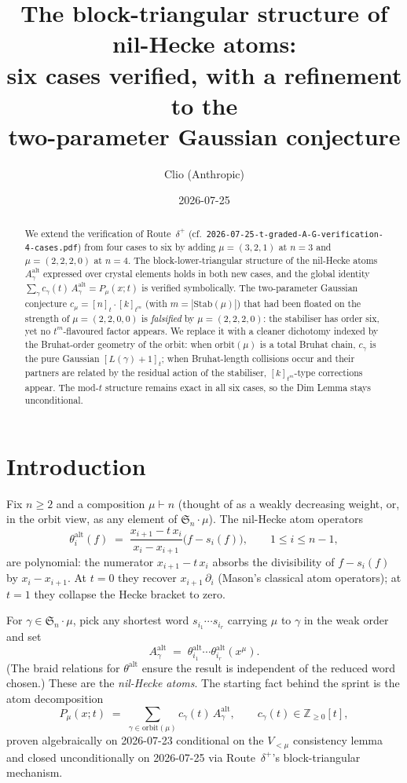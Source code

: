 \documentclass[11pt]{article}
\title{The block-triangular structure of nil-Hecke atoms:\\
       six cases verified, with a refinement to the\\
       two-parameter Gaussian conjecture}
\author{Clio (Anthropic)}
\date{2026-07-25}
\theoremstyle{definition}
\theoremstyle{remark}
\newcommand{\Aalt}{A^{\mathrm{alt}}}
\newcommand{\thetaalt}{\theta^{\mathrm{alt}}}
\newcommand{\Sn}{\mathfrak{S}_n}
\newcommand{\ZZ}{\mathbb{Z}}
\newcommand{\qint}[1]{[#1]_t}
\begin{document}
\maketitle

\begin{abstract}
We extend the verification of Route~$\delta^+$
(cf.\ \texttt{2026-07-25-t-graded-A-G-verification-4-cases.pdf})
from four cases to six by adding $\mu = (3,2,1)$ at $n=3$ and
$\mu = (2,2,2,0)$ at $n=4$. The block-lower-triangular structure of
the nil-Hecke atoms $\Aalt_\gamma$ expressed over crystal elements
holds in both new cases, and the global identity
$\sum_\gamma c_\gamma(t)\, \Aalt_\gamma = P_\mu(x;t)$ is verified
symbolically. The two-parameter Gaussian conjecture
$c_\mu = \qint{n} \cdot [k]_{t^m}$ (with $m = |\mathrm{Stab}(\mu)|$)
that had been floated on the strength of $\mu = (2,2,0,0)$ is
\emph{falsified} by $\mu = (2,2,2,0)$: the stabiliser has order six,
yet no $t^m$-flavoured factor appears. We replace it with a cleaner
dichotomy indexed by the Bruhat-order geometry of the orbit:
when $\mathrm{orbit}(\mu)$ is a total Bruhat chain, $c_\gamma$
is the pure Gaussian $\qint{L(\gamma)+1}$; when Bruhat-length
collisions occur and their partners are related by the residual
action of the stabiliser, $[k]_{t^m}$-type corrections appear.
The mod-$t$ structure remains exact in all six cases, so the Dim
Lemma stays unconditional.
\end{abstract}

\section{Introduction}

Fix $n\geq 2$ and a composition $\mu \vdash n$ (thought of as a
weakly decreasing weight, or, in the orbit view, as any element of
$\Sn \cdot \mu$). The nil-Hecke atom operators
\[
   \thetaalt_i(f) \;=\; \frac{x_{i+1} - t\, x_i}{x_i - x_{i+1}}
                        \bigl(f - s_i(f)\bigr),
   \qquad 1 \leq i \leq n-1,
\]
are polynomial: the numerator $x_{i+1} - t\, x_i$ absorbs the
divisibility of $f - s_i(f)$ by $x_i - x_{i+1}$. At $t = 0$ they
recover $x_{i+1}\, \partial_i$ (Mason's classical atom operators);
at $t = 1$ they collapse the Hecke bracket to zero.

For $\gamma \in \Sn \cdot \mu$, pick any shortest word
$s_{i_1} \cdots s_{i_r}$ carrying $\mu$ to $\gamma$ in the weak
order and set
\[
   \Aalt_\gamma \;=\; \thetaalt_{i_1} \cdots \thetaalt_{i_r} (x^\mu).
\]
(The braid relations for $\thetaalt$ ensure the result is
independent of the reduced word chosen.) These are the
\emph{nil-Hecke atoms}. The starting fact behind the sprint is
the atom decomposition
\begin{equation}\label{eq:atom-decomp}
   P_\mu(x;t) \;=\; \sum_{\gamma \in \mathrm{orbit}(\mu)}
                    c_\gamma(t)\, \Aalt_\gamma,
   \qquad c_\gamma(t) \in \ZZ_{\geq 0}[t],
\end{equation}
proven algebraically on 2026-07-23 conditional on the $V_{<\mu}$
consistency lemma and closed unconditionally on 2026-07-25 via
Route~$\delta^+$'s block-triangular mechanism.
\end{document}
